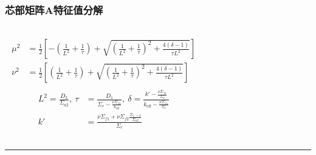 \documentclass[handout,10pt]{beamer}
\begin{document}
\begin{frame}
\frametitle{芯部矩阵$\pmb{A}$特征值分解}
\footnotesize
\begin{columns}
\begin{align*}
    \begin{split}
        \mu^2 &= \frac{1}{2}\left[-\left(\frac{1}{L^2}+\frac{1}{\tau}\right)+\sqrt{\left(\frac{1}{L^2}+\frac{1}{\tau}\right)^2+\frac{4(\delta-1)}{\tau L^2}}\right] \\
        \nu^2 &= \frac{1}{2}\left[\left(\frac{1}{L^2}+\frac{1}{\tau}\right)+\sqrt{\left(\frac{1}{L^2}+\frac{1}{\tau}\right)^2+\frac{4(\delta-1)}{\tau L^2}}\right]
    \end{split}
\end{align*}
\begin{align*}
    \begin{split}
        L^2 = \frac{D_2}{\Sigma_{a2}},\ \tau &= \frac{D_1}{\Sigma_r - \frac{\nu\Sigma_{f1}}{k_\mathrm{eff}}},\ \delta = \frac{k'-\frac{\nu\Sigma_{f1}}{\Sigma_r}}{k_\mathrm{eff}-\frac{\nu\Sigma_{f1}}{\Sigma_r}} \\
        k' &= \frac{\nu\Sigma_{f1}+\nu\Sigma_{f2}\frac{\Sigma_{1\rightarrow 2}}{\Sigma_{a2}}}{\Sigma_r}
    \end{split}
\end{align*}
\end{columns}

\noindent\rule{\textwidth}{0.5pt}


\end{frame}
\end{document}
